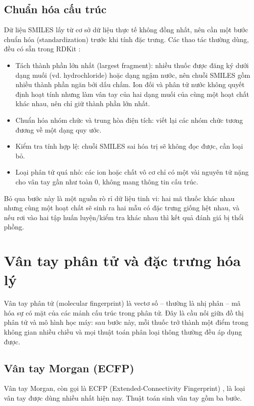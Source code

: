 \documentclass[12pt,a4paper,oneside]{report}
\begin{document}
\subsection{Chuẩn hóa cấu trúc}
Dữ liệu SMILES lấy từ cơ sở dữ liệu thực tế không đồng nhất, nên cần một bước
chuẩn hóa (standardization) trước khi tính đặc trưng. Các thao tác
thường dùng, đều có sẵn trong RDKit \cite{rdkit}:
\begin{itemize}
  \item Tách thành phần lớn nhất (largest fragment): nhiều thuốc được
        đăng ký dưới dạng muối (vd. hydrochloride) hoặc dạng ngậm nước, nên
        chuỗi SMILES gồm nhiều thành phần ngăn bởi dấu chấm. Ion đối và phân tử
        nước không quyết định hoạt tính nhưng làm vân tay của hai dạng muối của
        cùng một hoạt chất khác nhau, nên chỉ giữ thành phần lớn nhất.
  \item Chuẩn hóa nhóm chức và trung hòa điện tích: viết lại các nhóm
        chức tương đương về một dạng quy ước.
  \item Kiểm tra tính hợp lệ: chuỗi SMILES sai hóa trị sẽ không đọc
        được, cần loại bỏ.
  \item Loại phân tử quá nhỏ: các ion hoặc chất vô cơ chỉ có một vài
        nguyên tử nặng cho vân tay gần như toàn 0, không mang thông tin cấu
        trúc.
\end{itemize}
Bỏ qua bước này là một nguồn rò rỉ dữ liệu tinh vi: hai mã thuốc khác nhau
nhưng cùng một hoạt chất sẽ sinh ra hai mẫu có đặc trưng giống hệt nhau,
và nếu rơi vào hai tập huấn luyện/kiểm tra khác nhau thì kết quả đánh giá bị
thổi phồng.

\section{Vân tay phân tử và đặc trưng hóa lý}
\label{sec:vantay}

Vân tay phân tử (molecular fingerprint) là vectơ số -- thường là nhị
phân -- mã hóa sự có mặt của các mảnh cấu trúc trong phân tử. Đây là cầu nối
giữa đồ thị phân tử và mô hình học máy: sau bước này, mỗi thuốc trở thành một
điểm trong không gian nhiều chiều và mọi thuật toán phân loại thông thường đều
áp dụng được.

\subsection{Vân tay Morgan (ECFP)}
Vân tay Morgan, còn gọi là ECFP (Extended-Connectivity Fingerprint)
\cite{rogers2010}, là loại vân tay được dùng nhiều nhất hiện nay. Thuật toán
sinh vân tay gồm ba bước.
\end{document}
